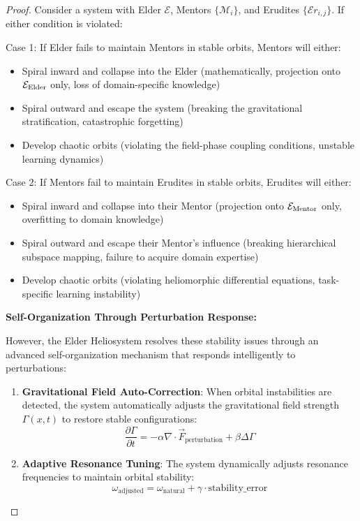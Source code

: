 \begin{proof}
Consider a system with Elder $\mathcal{E}$, Mentors $\{\mathcal{M}_i\}$, and Erudites $\{\mathcal{E}r_{i,j}\}$. If either condition is violated:

Case 1: If Elder fails to maintain Mentors in stable orbits, Mentors will either:
\begin{itemize}
    \item Spiral inward and collapse into the Elder (mathematically, projection onto $\mathcal{E}_{\text{Elder}}$ only, loss of domain-specific knowledge)
    \item Spiral outward and escape the system (breaking the gravitational stratification, catastrophic forgetting)
    \item Develop chaotic orbits (violating the field-phase coupling conditions, unstable learning dynamics)
\end{itemize}

Case 2: If Mentors fail to maintain Erudites in stable orbits, Erudites will either:
\begin{itemize}
    \item Spiral inward and collapse into their Mentor (projection onto $\mathcal{E}_{\text{Mentor}}$ only, overfitting to domain knowledge)
    \item Spiral outward and escape their Mentor's influence (breaking hierarchical subspace mapping, failure to acquire domain expertise)
    \item Develop chaotic orbits (violating heliomorphic differential equations, task-specific learning instability)
\end{itemize}

\textbf{Self-Organization Through Perturbation Response:}

However, the Elder Heliosystem resolves these stability issues through an advanced self-organization mechanism that responds intelligently to perturbations:

\begin{enumerate}
    \item \textbf{Gravitational Field Auto-Correction}: When orbital instabilities are detected, the system automatically adjusts the gravitational field strength $\Gamma(x,t)$ to restore stable configurations:
    \begin{equation}
    \frac{\partial \Gamma}{\partial t} = -\alpha \nabla \cdot \vec{F}_{\text{perturbation}} + \beta \Delta \Gamma
    \end{equation}
    
    \item \textbf{Adaptive Resonance Tuning}: The system dynamically adjusts resonance frequencies to maintain orbital stability:
    \begin{equation}
    \omega_{\text{adjusted}} = \omega_{\text{natural}} + \gamma \cdot \text{stability\_error}
    \end{equation}
    

\end{enumerate}
\end{proof}
